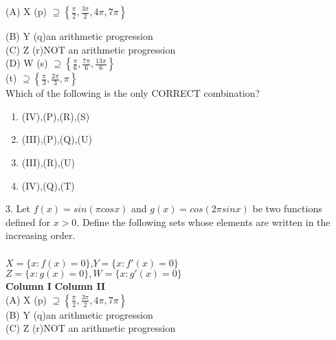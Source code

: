 \documentclass[journal,12pt,twocolumn]{IEEEtran}
\theoremstyle{remark}
\begin{document}
(A) X \hspace{42pt} (p) $\supseteq \left\{ \frac{\pi}{2}, \frac{3\pi}{2}, 4\pi, 7\pi \right\}$


(B) Y \hspace{42pt} (q)an arithmetic progression
\\

(C) Z \hspace{45pt} (r)NOT an arithmetic progression
\\

(D) W\hspace{45pt}  (s) $\supseteq\left\{\frac{\pi}{6},\frac{7\pi}{6},\frac{13\pi}{6}\right\}$
\\

\hspace{75pt} (t) $\supseteq\left\{\frac{\pi}{3},\frac{2\pi}{3},\pi\right\}$
\\

Which of the following is the only CORRECT combination?
\\
\begin{enumerate}[label=\alph*]
\item(IV),(P),(R),(S)
\item(III),(P),(Q),(U)
\item(III),(R),(U)
\item(IV),(Q),(T)
\end{enumerate}


3. Let $f(x)=sin(\pi cosx)$ and $g(x)=cos(2\pi sinx)$ be two functions defined for $x>0$. Define the following sets whose elements are written in the increasing order.\hfill{}
\\\\$X=\{x:f(x)=0\}$,$Y=\{x:f'(x)=0\}$\\
$Z=\{x:g(x)=0\}, W=\{x:g'(x)=0\}$
\\

\textbf{Column I}  \hspace{2cm}\textbf{Column II}
\\

(A) X \hspace{42pt} (p)  $\supseteq\left\{\frac{\pi}{2},\frac{3\pi}{2},4\pi,7\pi\right\}$
\\

(B) Y \hspace{42pt} (q)an arithmetic progression
\\

(C) Z \hspace{45pt} (r)NOT an arithmetic progression
\\
\end{document}
